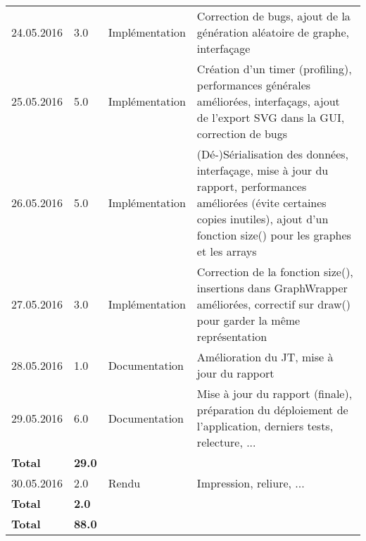 \documentclass[french]{article}
\begin{document}
\begin{longtable}{p{}|p{}|p{}|p{}}
		24.05.2016 & 3.0 & Implémentation & Correction de bugs, ajout de la génération aléatoire de graphe, interfaçage\\
		25.05.2016 & 5.0 & Implémentation & Création d'un timer (profiling), performances générales améliorées, interfaçags, ajout de l'export SVG dans la GUI, correction de bugs\\
		26.05.2016 & 5.0 & Implémentation & (Dé-)Sérialisation des données, interfaçage, mise à jour du rapport, performances améliorées (évite certaines copies inutiles), ajout d'un fonction size() pour les graphes et les arrays\\
		27.05.2016 & 3.0 & Implémentation & Correction de la fonction size(), insertions dans GraphWrapper améliorées, correctif sur draw() pour garder la même représentation\\
		28.05.2016 & 1.0 & Documentation & Amélioration du JT, mise à jour du rapport\\
		29.05.2016 & 6.0 & Documentation & Mise à jour du rapport (finale), préparation du déploiement de l'application, derniers tests, relecture, ...\\  
		\textbf{Total} & \textbf{29.0} &&\\
		\hline
		30.05.2016 & 2.0 & Rendu & Impression, reliure, ...\\
		\textbf{Total} & \textbf{2.0} && \\
		\hline
		\hline
		\textbf{Total} & \textbf{88.0} &&\\
	\end{longtable}
	
\end{document}
